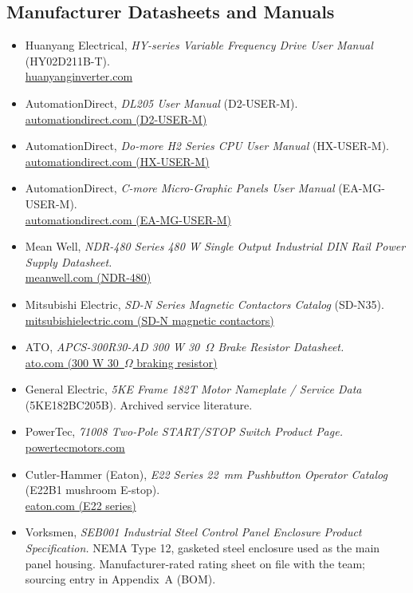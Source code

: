 \documentclass[hidelinks,12pt]{article}
\begin{document}
\subsection*{Manufacturer Datasheets and Manuals}
\begin{itemize}\setlength{\itemsep}{2pt}
    \item Huanyang Electrical, \emph{HY-series Variable Frequency Drive User Manual} (HY02D211B-T). \\
      \href{https://www.huanyanginverter.com}{huanyanginverter.com}
    \item AutomationDirect, \emph{DL205 User Manual} (D2-USER-M). \\
      \href{https://www.automationdirect.com/static/manuals/d2userm/d2userm.html}{automationdirect.com (D2-USER-M)}
    \item AutomationDirect, \emph{Do-more H2 Series CPU User Manual} (HX-USER-M). \\
      \href{https://www.automationdirect.com/static/manuals/hxuserm/hxuserm.html}{automationdirect.com (HX-USER-M)}
    \item AutomationDirect, \emph{C-more Micro-Graphic Panels User Manual} (EA-MG-USER-M). \\
      \href{https://www.automationdirect.com/static/manuals/eamguserm/eamguserm.html}{automationdirect.com (EA-MG-USER-M)}
    \item Mean Well, \emph{NDR-480 Series 480 W Single Output Industrial DIN Rail Power Supply Datasheet.} \\
      \href{https://www.meanwell.com/productPdf.aspx?i=458}{meanwell.com (NDR-480)}
    \item Mitsubishi Electric, \emph{SD-N Series Magnetic Contactors Catalog} (SD-N35). \\
      \href{https://www.mitsubishielectric.com/fa/products/cnt/mc_mms/index.html}{mitsubishielectric.com (SD-N magnetic contactors)}
    \item ATO, \emph{APCS-300R30-AD 300 W 30~$\Omega$ Brake Resistor Datasheet.} \\
      \href{https://www.ato.com/300-watt-30-ohm-braking-resistor}{ato.com (300 W 30~$\Omega$ braking resistor)}
    \item General Electric, \emph{5KE Frame 182T Motor Nameplate / Service Data} (5KE182BC205B). Archived service literature.
    \item PowerTec, \emph{71008 Two-Pole START/STOP Switch Product Page.} \\
      \href{https://www.powertecmotors.com}{powertecmotors.com}
    \item Cutler-Hammer (Eaton), \emph{E22 Series 22~mm Pushbutton Operator Catalog} (E22B1 mushroom E-stop). \\
      \href{https://www.eaton.com}{eaton.com (E22 series)}
    \item Vorksmen, \emph{SEB001 Industrial Steel Control Panel Enclosure Product Specification.} NEMA Type 12, gasketed steel enclosure used as the main panel housing. Manufacturer-rated rating sheet on file with the team; sourcing entry in Appendix~A (BOM).
\end{itemize}
\end{document}
